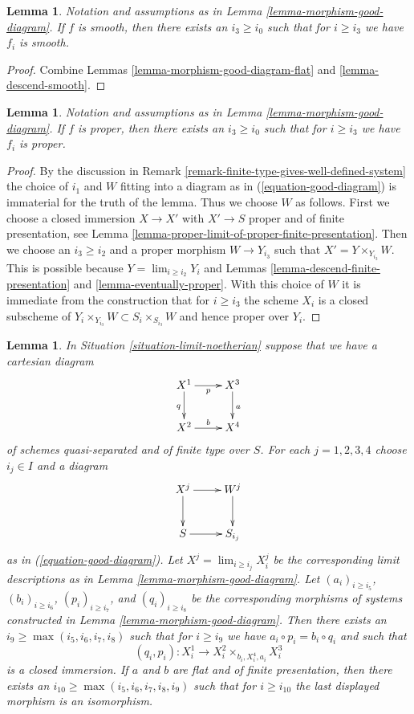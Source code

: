 \documentclass{stacks-project}
\theoremstyle{plain}
\newtheorem{lemma}[subsection]{Lemma}
\theoremstyle{definition}
\theoremstyle{remark}
\numberwithin{equation}{subsection}
\def\lim{\mathop{\mathrm{lim}}\nolimits}
\begin{document}
\begin{lemma}
\label{lemma-morphism-good-diagram-smooth}
Notation and assumptions as in Lemma \ref{lemma-morphism-good-diagram}.
If $f$ is smooth, then there exists an $i_3 \geq i_0$ such that for
$i \geq i_3$ we have $f_i$ is smooth.
\end{lemma}

\begin{proof}
Combine Lemmas \ref{lemma-morphism-good-diagram-flat} and
\ref{lemma-descend-smooth}.
\end{proof}

\begin{lemma}
\label{lemma-morphism-good-diagram-proper}
Notation and assumptions as in Lemma \ref{lemma-morphism-good-diagram}.
If $f$ is proper, then there exists an $i_3 \geq i_0$ such that for
$i \geq i_3$ we have $f_i$ is proper.
\end{lemma}

\begin{proof}
By the discussion in 
Remark \ref{remark-finite-type-gives-well-defined-system}
the choice of $i_1$ and $W$ fitting into a diagram as in
(\ref{equation-good-diagram}) is immaterial for the truth of
the lemma. Thus we choose $W$ as follows.
First we choose a closed immersion $X \to X'$
with $X' \to S$ proper and of finite presentation, see
Lemma \ref{lemma-proper-limit-of-proper-finite-presentation}.
Then we choose an $i_3 \geq i_2$ and a proper morphism $W \to Y_{i_3}$
such that $X' = Y \times_{Y_{i_3}} W$. This is possible because
$Y = \lim_{i \geq i_2} Y_i$ and
Lemmas \ref{lemma-descend-finite-presentation} and
\ref{lemma-eventually-proper}.
With this choice of $W$ it is immediate from the construction that
for $i \geq i_3$ the scheme $X_i$ is a closed subscheme of
$Y_i \times_{Y_{i_3}} W \subset S_i \times_{S_{i_3}} W$
and hence proper over $Y_i$.
\end{proof}

\begin{lemma}
\label{lemma-good-diagram-fibre-product}
In Situation \ref{situation-limit-noetherian} suppose that we have a
cartesian diagram
$$
\xymatrix{
X^1 \ar[r]_p \ar[d]_q & X^3 \ar[d]^a \\
X^2 \ar[r]^b & X^4
}
$$
of schemes quasi-separated and of finite type over $S$.
For each $j = 1, 2, 3, 4$ choose $i_j \in I$ and a diagram
$$
\xymatrix{
X^j \ar[r] \ar[d] & W^j \ar[d] \\
S \ar[r] & S_{i_j}
}
$$
as in (\ref{equation-good-diagram}). Let
$X^j = \lim_{i \geq i_j} X^j_i$ be the corresponding limit descriptions
as in Lemma \ref{lemma-morphism-good-diagram}.
Let $(a_i)_{i \geq i_5}$, $(b_i)_{i \geq i_6}$, $(p_i)_{i \geq i_7}$, and
$(q_i)_{i \geq i_8}$ be the corresponding morphisms of systems constructed
in Lemma \ref{lemma-morphism-good-diagram}. Then there exists an
$i_9 \geq \max(i_5, i_6, i_7, i_8)$ such that for $i \geq i_9$ we have
$a_i \circ p_i = b_i \circ q_i$ and such that
$$
(q_i, p_i) : X^1_i \longrightarrow X^2_i \times_{b_i, X^4_i, a_i} X^3_i
$$
is a closed immersion.
If $a$ and $b$ are flat and of finite presentation, then there exists an
$i_{10} \geq \max(i_5, i_6, i_7, i_8, i_9)$ such that for $i \geq i_{10}$
the last displayed morphism is an isomorphism.
\end{lemma}
\end{document}
